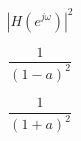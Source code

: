 \documentclass{beamer}
\begin{document}
\[ {|H(e^{j\omega})|}^2 \]

\[ \frac{1}{(1-a)^2} \]

\[ \frac{1}{(1+a)^2} \]
\end{document}

